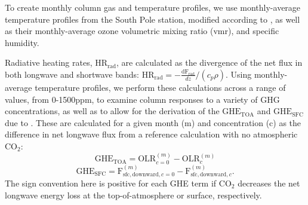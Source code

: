 \documentclass[draft]{agujournal2019}
\begin{document}
To create monthly column gas and temperature profiles, we use monthly-average temperature profiles from the South Pole station, modified according to , as well as their monthly-average ozone volumetric mixing ratio (vmr), and specific humidity.

Radiative heating rates, $\text{HR}_{\text{rad}}$, are calculated as the divergence of the net flux in both longwave and shortwave bands: $\text{HR}_{\text{rad}} = -\frac{\text{dF}_{\text{rad}}}{dz} /(c_p \rho) $. Using monthly-average temperature profiles, we perform these calculations across a range of  values, from 0-1500ppm, to examine column responses to a variety of GHG concentrations, as well as to allow for the derivation of the $\text{GHE}_\text{{TOA}}$ and $\text{GHE}_{\text{SFC}}$ due to . These are calculated for a given month (m) and  concentration (c) as the difference in net longwave flux from a reference calculation with no atmospheric CO$_2$: 
\begin{equation}
    {\text{GHE}_\text{{TOA}}} = \text{OLR}_{c=0}^{(m)} - \text{OLR}_{c}^{(m)}
\end{equation}
\begin{equation}
    {\text{GHE}_\text{{SFC}}} = \text{F}_{\text{sfc}, \text{downward}, c=0}^{(m)} - \text{F}_{\text{sfc}, \text{downward}, c}^{(m)}.
\end{equation}
The sign convention here is positive for each GHE term if CO$_2$ decreases the net longwave energy loss at the top-of-atmosphere or surface, respectively.
\end{document}
